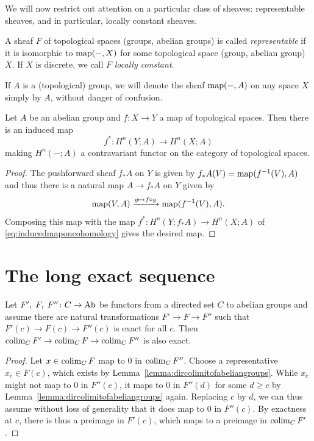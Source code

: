 \documentclass[a4paper,openany]{scrbook}
\begin{document}
We will now restrict out attention on a particular class of sheaves: representable sheaves, and in particular, locally constant sheaves.

\begin{defn}
A sheaf $F$ of topological spaces (groups, abelian groups) is called \emph{representable} if it is isomorphic to $\operatorname{map}(-,X)$ for some topological space (group, abelian group) $X$. If $X$ is discrete, we call $F$ \emph{locally constant}.
\end{defn}

If $A$ is a (topological) group, we will denote the sheaf $\operatorname{map}(-,A)$ on any space $X$ simply by $A$, without danger of confusion.

\begin{lemma}
Let $A$ be an abelian group and $f\colon X \to Y$ a map of topological spaces. Then there is an induced map
\[
f^*\colon H^n(Y;A) \to H^n(X;A)
\]
making $H^n(-;A)$ a contravariant functor on the category of topological spaces.
\end{lemma}
\begin{proof}
The pushforward sheaf $f_*A$ on $Y$ is given by $f_*A(V) = \operatorname{map}(f^{-1}(V),A)$ and thus there is a natural map $A \to f_*A$ on $Y$ given by
\[
\operatorname{map}(V,A) \xrightarrow{g \mapsto f \circ g} \operatorname{map}(f^{-1}(V),A).
\] 
Composing this map with the map $f^*\colon H^n(Y;f_*A) \to H^n(X;A)$ of \eqref{eq:inducedmaponcohomology} gives the desired map.
\end{proof}

\section{The long exact sequence}

\begin{lemma}\label{lemma:colimexact}
Let $F', \; F,\; F''\colon C \to \operatorname{Ab}$ be functors from a directed set $C$ to abelian groups and assume there are natural transformations $F' \to F \to F''$ such that $F'(c) \to F(c) \to F''(c) $ is exact for all $c$. Then $\colim_C F' \to \colim_C F \to \colim_C F''$ is also exact.
\end{lemma}
\begin{proof}
Let $x \in \colim_C F$ map to $0$ in $\colim_C F''$. Choose a representative $x_c \in F(c)$, which exists by Lemma~\ref{lemma:dircolimitofabeliangroups}. While $x_c$ might not map to $0$ in $F''(c)$, it maps to $0$ in $F''(d)$ for some $d \geq c$ by Lemma~\ref{lemma:dircolimitofabeliangroups} again. Replacing $c$ by $d$, we can thus assume without loss of generality that it does map to $0$ in $F''(c)$. By exactness at $c$, there is thus a preimage in $F'(c)$, which maps to a preimage in $\colim_C F'$.
\end{proof}
\end{document}
